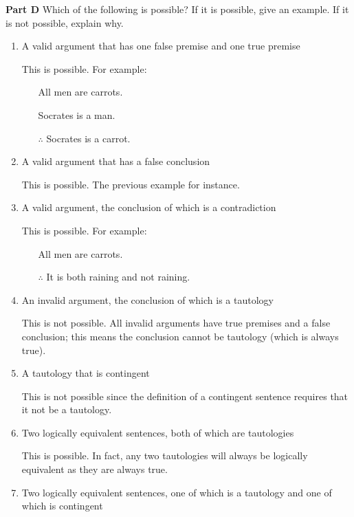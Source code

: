 \documentclass[12pt, letterpaper, twoside]{article}
\begin{document}
\noindent \textbf{Part D} Which of the following is
possible? If it is possible, give an example. If it is not
possible, explain why.
\begin{enumerate}
    \item A valid argument that has one false premise and
      one true premise

    This is possible. For example:
    \begin{enumerate}
        \item[] All men are carrots.
        \item[] Socrates is a man.
        \item[$\therefore$] Socrates is a carrot.
    \end{enumerate}

    \item A valid argument that has a false conclusion

    This is possible. The previous example for instance.

    \item A valid argument, the conclusion of which is a
      contradiction

    This is possible. For example:
    \begin{enumerate}
        \item[] All men are carrots.
        \item[$\therefore$] It is both raining and not
          raining.
    \end{enumerate}

    \item An invalid argument, the conclusion of which is a
      tautology

    This is not possible. All invalid arguments have true
    premises and a false conclusion; this means the
    conclusion cannot be tautology (which is always true).

    \item A tautology that is contingent

    This is not possible since the definition of a
    contingent sentence requires that it not be a tautology.

    \item Two logically equivalent sentences, both of which
      are tautologies

    This is possible. In fact, any two tautologies will
    always be logically equivalent as they are always true.

    \item Two logically equivalent sentences, one of which
      is a tautology and one of which is contingent


\end{enumerate}
\end{document}
